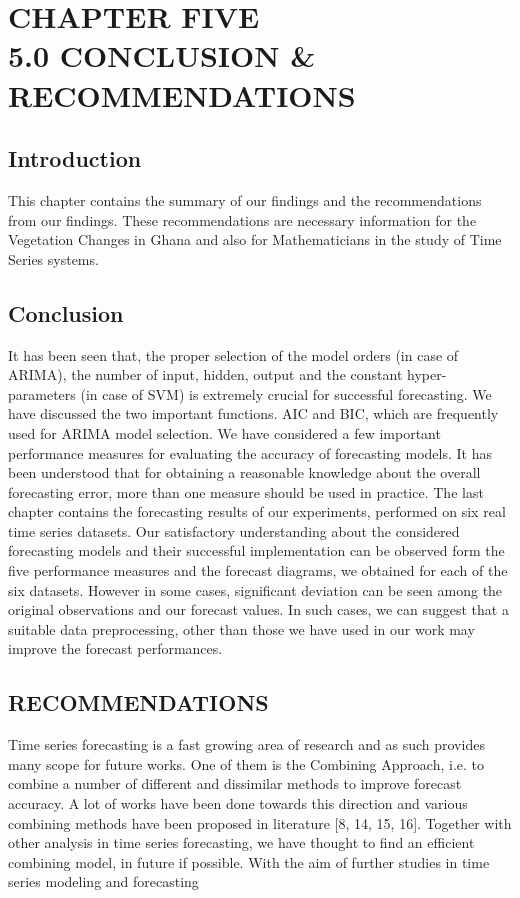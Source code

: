 \chapter{CHAPTER FIVE\\5.0 CONCLUSION \& RECOMMENDATIONS}
\label{Chapter5}
\section{Introduction}
This chapter contains the summary of our findings and the recommendations from our findings. These recommendations are necessary information for the Vegetation Changes in Ghana and also for Mathematicians in the study of Time Series systems.

\section{Conclusion}
It has been seen that, the proper selection of the model orders (in case of ARIMA), the number of input, hidden, output and the constant
hyper-parameters (in case of SVM) is extremely crucial for successful forecasting. We have discussed the two important functions. AIC and BIC,
which are frequently used for ARIMA model selection. 
We have considered a few important performance measures for evaluating the accuracy of forecasting models. It has been understood that for
obtaining a reasonable knowledge about the overall forecasting error, more than one measure should be used in practice. The last chapter
contains the forecasting results of our experiments, performed on six real time series datasets. Our satisfactory understanding about the
considered forecasting models and their successful implementation can be observed form the five performance measures and the forecast diagrams,
we obtained for each of the six datasets. However in some cases, significant deviation can be seen among the original observations and
our forecast values. In such cases, we can suggest that a suitable data preprocessing, other than those we have used in our work may improve the
forecast performances.

\section{RECOMMENDATIONS}
Time series forecasting is a fast growing area of research and as such provides many scope for future works. One of them is the Combining Approach, i.e. to combine a number of different and dissimilar methods to improve forecast accuracy. A lot of works have been done towards this direction and various combining methods have been proposed in literature
{[}8, 14, 15, 16{]}. Together with other analysis in time series forecasting, we have thought to find an efficient combining model, in
future if possible. With the aim of further studies in time series modeling and forecasting